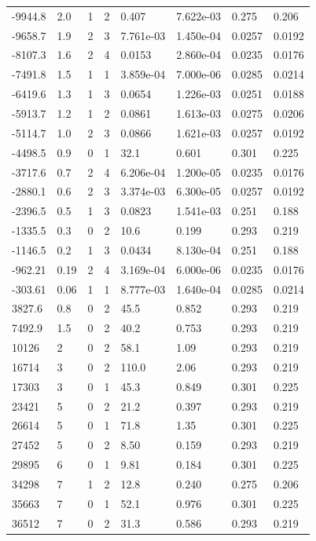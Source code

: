 \documentclass[preview]{standalone}
\begin{document}
{{\begin{tabular}{L{1.2cm}C{1.2cm} C{0.3cm}C{0.5cm} C{1.4cm}C{1.4cm} C{1.4cm}C{1.4cm}}
  -9944.8  &   2.0  & 1     &  2 &  0.407  & 7.622e-03  & 0.275 &  0.206   \\ 
  -9658.7  &   1.9  & 2     &  3 &  7.761e-03  & 1.450e-04  & 0.0257 &  0.0192   \\ 
  -8107.3  &   1.6  & 2     &  4 &  0.0153  & 2.860e-04  & 0.0235 &  0.0176   \\ 
  -7491.8  &   1.5  & 1     &  1 &  3.859e-04  & 7.000e-06  & 0.0285 &  0.0214   \\ 
  -6419.6  &   1.3  & 1     &  3 &  0.0654  & 1.226e-03  & 0.0251 &  0.0188   \\ 
  -5913.7  &   1.2  & 1     &  2 &  0.0861  & 1.613e-03  & 0.0275 &  0.0206   \\ 
  -5114.7  &   1.0  & 2     &  3 &  0.0866  & 1.621e-03  & 0.0257 &  0.0192   \\ 
  -4498.5  &   0.9  & 0     &  1 &  32.1  & 0.601  & 0.301 &  0.225   \\ 
  -3717.6  &   0.7  & 2     &  4 &  6.206e-04  & 1.200e-05  & 0.0235 &  0.0176   \\ 
  -2880.1  &   0.6  & 2     &  3 &  3.374e-03  & 6.300e-05  & 0.0257 &  0.0192   \\ 
  -2396.5  &   0.5  & 1     &  3 &  0.0823  & 1.541e-03  & 0.251 &  0.188   \\ 
  -1335.5  &   0.3  & 0     &  2 &  10.6  & 0.199  & 0.293 &  0.219   \\ 
  -1146.5  &   0.2  & 1     &  3 &  0.0434  & 8.130e-04  & 0.251 &  0.188   \\ 
  -962.21  &  0.19  & 2     &  4 &  3.169e-04  & 6.000e-06  & 0.0235 &  0.0176   \\ 
  -303.61  &  0.06  & 1     &  1 &  8.777e-03  & 1.640e-04  & 0.0285 &  0.0214   \\ 
  3827.6  &   0.8  & 0     &  2 &  45.5  & 0.852  & 0.293 &  0.219   \\ 
  7492.9  &   1.5  & 0     &  2 &  40.2  & 0.753  & 0.293 &  0.219   \\ 
  10126  &     2  & 0     &  2 &  58.1  & 1.09  & 0.293 &  0.219   \\ 
  16714  &     3  & 0     &  2 &  110.0  & 2.06  & 0.293 &  0.219   \\ 
  17303  &     3  & 0     &  1 &  45.3  & 0.849  & 0.301 &  0.225   \\ 
  23421  &     5  & 0     &  2 &  21.2  & 0.397  & 0.293 &  0.219   \\ 
  26614  &     5  & 0     &  1 &  71.8  & 1.35  & 0.301 &  0.225   \\ 
  27452  &     5  & 0     &  2 &  8.50  & 0.159  & 0.293 &  0.219   \\ 
  29895  &     6  & 0     &  1 &  9.81  & 0.184  & 0.301 &  0.225   \\ 
  34298  &     7  & 1     &  2 &  12.8  & 0.240  & 0.275 &  0.206   \\ 
  35663  &     7  & 0     &  1 &  52.1  & 0.976  & 0.301 &  0.225   \\ 
  36512  &     7  & 0     &  2 &  31.3  & 0.586  & 0.293 &  0.219   \\ 
\hline 
\end{tabular} 

}}
\end{document}

